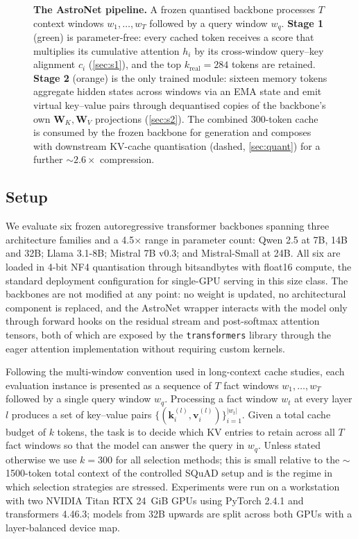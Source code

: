 \begin{figure}[t]
{\begin{tikzpicture}
\end{tikzpicture}%
}
\caption{\textbf{The AstroNet pipeline.} A frozen quantised backbone
processes $T$ context windows $w_1,\ldots,w_T$ followed by a query window
$w_q$. \textbf{Stage 1} (green) is parameter-free: every cached token
receives a score that multiplies its cumulative attention $h_i$ by its
cross-window query--key alignment $c_i$ (\cref{sec:s1}), and the top
$k_{\mathrm{real}}{=}284$ tokens are retained. \textbf{Stage 2} (orange)
is the only trained module: sixteen memory tokens aggregate hidden states
across windows via an EMA state and emit virtual key--value pairs
through dequantised copies of the backbone's own
$\mathbf{W}_K, \mathbf{W}_V$ projections (\cref{sec:s2}). The combined
$300$-token cache is consumed by the frozen backbone for generation
and composes with downstream KV-cache quantisation (dashed,
\cref{sec:quant}) for a further $\sim 2.6\times$ compression.}
\label{fig:architecture}
\end{figure}

\subsection{Setup}\label{sec:setup}

We evaluate six frozen autoregressive transformer backbones spanning three
architecture families and a 4.5$\times$ range in parameter count: Qwen 2.5
at 7B, 14B and 32B; Llama 3.1-8B; Mistral 7B v0.3; and Mistral-Small at
24B. All six are loaded in 4-bit NF4 quantisation through
bitsandbytes\cite{dettmers2023nf4} with float16 compute, the standard
deployment configuration for single-GPU serving in this size class. The
backbones are not modified at any point: no weight is updated, no
architectural component is replaced, and the AstroNet wrapper interacts
with the model only through forward hooks on the residual stream and
post-softmax attention tensors, both of which are exposed by the
\texttt{transformers} library through the eager attention implementation
without requiring custom kernels.

Following the multi-window convention used in long-context cache
studies, each evaluation instance is presented as a sequence of $T$ fact
windows $w_1,\dots,w_T$ followed by a single query window $w_q$.
Processing a fact window $w_t$ at every layer $l$ produces a set of
key--value pairs $\{(\mathbf{k}_i^{(l)},\mathbf{v}_i^{(l)})\}_{i=1}^{|w_t|}$.
Given a total cache budget of $k$ tokens, the task is to decide which
KV entries to retain across all $T$ fact windows so that the model can
answer the query in $w_q$. Unless stated otherwise we use $k=300$ for
all selection methods; this is small relative to the $\sim$1500-token
total context of the controlled SQuAD setup and is the regime in which
selection strategies are stressed. Experiments were run on a workstation
with two NVIDIA Titan RTX 24~GiB GPUs using PyTorch 2.4.1 and
transformers 4.46.3; models from 32B upwards are split across both GPUs
with a layer-balanced device map.


